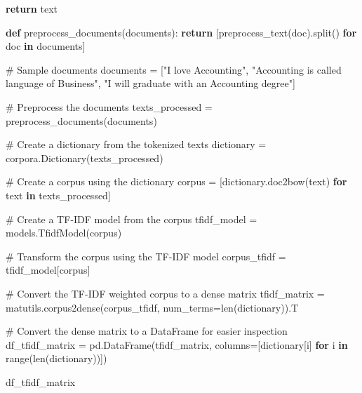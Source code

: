 \documentclass[
  letterpaper,
  DIV=11,
  numbers=noendperiod]{scrreprt}
\newenvironment{Shaded}{\begin{snugshade}}{\end{snugshade}}
\newcommand{\BuiltInTok}[1]{\textcolor[rgb]{0.00,0.23,0.31}{#1}}
\newcommand{\CommentTok}[1]{\textcolor[rgb]{0.37,0.37,0.37}{#1}}
\newcommand{\ControlFlowTok}[1]{\textcolor[rgb]{0.00,0.23,0.31}{\textbf{#1}}}
\newcommand{\KeywordTok}[1]{\textcolor[rgb]{0.00,0.23,0.31}{\textbf{#1}}}
\newcommand{\NormalTok}[1]{\textcolor[rgb]{0.00,0.23,0.31}{#1}}
\newcommand{\OperatorTok}[1]{\textcolor[rgb]{0.37,0.37,0.37}{#1}}
\newcommand{\StringTok}[1]{\textcolor[rgb]{0.13,0.47,0.30}{#1}}
\begin{document}
\begin{Shaded}
\begin{Highlighting}[]
    \ControlFlowTok{return}\NormalTok{ text}

\KeywordTok{def}\NormalTok{ preprocess\_documents(documents):}
    \ControlFlowTok{return}\NormalTok{ [preprocess\_text(doc).split() }\ControlFlowTok{for}\NormalTok{ doc }\KeywordTok{in}\NormalTok{ documents]}

\CommentTok{\# Sample documents}
\NormalTok{documents }\OperatorTok{=}\NormalTok{ [}\StringTok{"I love Accounting"}\NormalTok{, }\StringTok{"Accounting is called language of Business"}\NormalTok{, }\StringTok{"I will graduate with an Accounting degree"}\NormalTok{]}

\CommentTok{\# Preprocess the documents}
\NormalTok{texts\_processed }\OperatorTok{=}\NormalTok{ preprocess\_documents(documents)}

\CommentTok{\# Create a dictionary from the tokenized texts}
\NormalTok{dictionary }\OperatorTok{=}\NormalTok{ corpora.Dictionary(texts\_processed)}

\CommentTok{\# Create a corpus using the dictionary}
\NormalTok{corpus }\OperatorTok{=}\NormalTok{ [dictionary.doc2bow(text) }\ControlFlowTok{for}\NormalTok{ text }\KeywordTok{in}\NormalTok{ texts\_processed]}
\end{Highlighting}
\end{Shaded}

\begin{Shaded}
\begin{Highlighting}[]
\CommentTok{\# Create a TF{-}IDF model from the corpus}
\NormalTok{tfidf\_model }\OperatorTok{=}\NormalTok{ models.TfidfModel(corpus)}

\CommentTok{\# Transform the corpus using the TF{-}IDF model}
\NormalTok{corpus\_tfidf }\OperatorTok{=}\NormalTok{ tfidf\_model[corpus]}

\CommentTok{\# Convert the TF{-}IDF weighted corpus to a dense matrix}
\NormalTok{tfidf\_matrix }\OperatorTok{=}\NormalTok{ matutils.corpus2dense(corpus\_tfidf, num\_terms}\OperatorTok{=}\BuiltInTok{len}\NormalTok{(dictionary)).T}

\CommentTok{\# Convert the dense matrix to a DataFrame for easier inspection}
\NormalTok{df\_tfidf\_matrix }\OperatorTok{=}\NormalTok{ pd.DataFrame(tfidf\_matrix, columns}\OperatorTok{=}\NormalTok{[dictionary[i] }\ControlFlowTok{for}\NormalTok{ i }\KeywordTok{in} \BuiltInTok{range}\NormalTok{(}\BuiltInTok{len}\NormalTok{(dictionary))])}

\NormalTok{df\_tfidf\_matrix}
\end{Highlighting}
\end{Shaded}
\end{document}

